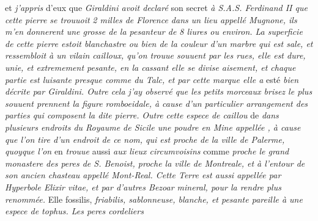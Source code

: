 et \textit{j'appris} d'eux que \textit{Giraldini\protect{} avoit declar\'{e}} son secret \textit{\`{a} S.A.S. Ferdinand II que cette pierre se trouuoit}  \textit{2 milles de Florence\protect{} dans un lieu appell\'{e} Mugnone\protect{}, ils m'en donnerent une grosse de la pesanteur de 8 liures ou environ. La superficie de cette pierre estoit blanchastre ou bien de la couleur d'un marbre qui est sale, et ressembloit \`{a} un vilain cailloux, qu'on trouue souuent par les rues, elle est dure, unie, et extremement pesante, en la cassant elle se divise aisement, et chaque partie est luisante presque \mbox{comme} du Talc, et par cette marque elle a} est\'{e} \textit{bien d\'{e}crite par Giraldini\protect{}. Outre cela j'ay observ\'{e} que les petits morceaux brisez le plus souuent prennent la figure romboeidale, \`{a} cause d'un particulier arrangement des parties qui composent la dite pierre.}
%
\textit{Outre} \textit{cette espece de caillou} de  \textit{dans plusieurs endroits du Royaume de Sicile\protect{} une poudre en Mine appell\'{e}e , \`{a} cause que l'on tire d'un endroit de ce nom, qui est proche de la ville de Palerme\protect{}, quoyque l'on} en \textit{trouue} aussi \textit{aux lieux circumvoisins} comme \textit{proche le grand monastere des peres de S. Benoist, proche la ville de Montreale\protect{}, et \`{a} l'entour de son ancien chasteau appell\'{e} Mont-Real\protect{}. Cette Terre est aussi appell\'{e}e par Hyperbole Elixir vitae\protect{}, et par d'autres Bezoar mineral\protect{}, pour la rendre plus renomm\'{e}e.} Elle fossilis, \textit{friabilis, sablonneuse, blanche, et pesante pareille \`{a} une espece de tophus\protect{}. Les peres cordeliers}
